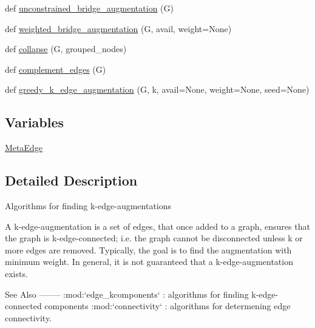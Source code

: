 \begin{DoxyCompactItemize}
\item 
def \hyperlink{namespacenetworkx_1_1algorithms_1_1connectivity_1_1edge__augmentation_a006736cee2bcf2eaf1b48ac6ce6cd84d}{unconstrained\+\_\+bridge\+\_\+augmentation} (G)
\item 
def \hyperlink{namespacenetworkx_1_1algorithms_1_1connectivity_1_1edge__augmentation_a51cdfaec1b52b2360bd9cac0838c3dd0}{weighted\+\_\+bridge\+\_\+augmentation} (G, avail, weight=None)
\item 
def \hyperlink{namespacenetworkx_1_1algorithms_1_1connectivity_1_1edge__augmentation_a79eb970749b4a6d840dd1f23fb2f0a43}{collapse} (G, grouped\+\_\+nodes)
\item 
def \hyperlink{namespacenetworkx_1_1algorithms_1_1connectivity_1_1edge__augmentation_a5d7f5daaa006218e0ba96ca546f1cd78}{complement\+\_\+edges} (G)
\item 
def \hyperlink{namespacenetworkx_1_1algorithms_1_1connectivity_1_1edge__augmentation_ac83e34bbae10a9475ed1ebdd7f31981e}{greedy\+\_\+k\+\_\+edge\+\_\+augmentation} (G, k, avail=None, weight=None, seed=None)
\end{DoxyCompactItemize}
\subsection*{Variables}
\begin{DoxyCompactItemize}
\item 
\hyperlink{namespacenetworkx_1_1algorithms_1_1connectivity_1_1edge__augmentation_aa65a1a7d28685a10b7e979f777a6bc0b}{Meta\+Edge}
\end{DoxyCompactItemize}


\subsection{Detailed Description}
\begin{DoxyVerb}Algorithms for finding k-edge-augmentations

A k-edge-augmentation is a set of edges, that once added to a graph, ensures
that the graph is k-edge-connected; i.e. the graph cannot be disconnected
unless k or more edges are removed.  Typically, the goal is to find the
augmentation with minimum weight.  In general, it is not guaranteed that a
k-edge-augmentation exists.

See Also
--------
:mod:`edge_kcomponents` : algorithms for finding k-edge-connected components
:mod:`connectivity` : algorithms for determening edge connectivity.
\end{DoxyVerb}
 

